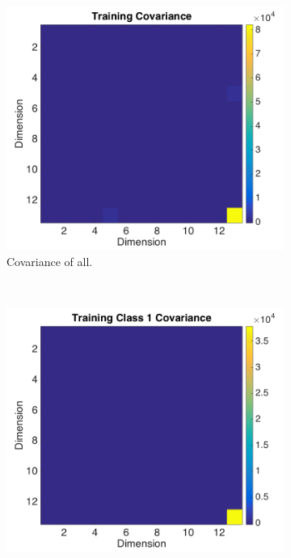 \documentclass[a4paper, 10pt, conference]{ieeeconf}
\begin{document}
\begin{figure}[!ht]
  \captionsetup[subfigure]{position=b}
  \centering
    \begin{subfigure}{0.45\textwidth}
      \includegraphics[width=\textwidth]{pic/covtraining.png}
      \caption{Covariance of all.}
      \label{fig:covtraining}
    \end{subfigure}
    ~
    \begin{subfigure}{0.45\textwidth}
      \includegraphics[width=\textwidth]{pic/covclass1.png}

\end{subfigure}
\end{figure}
\end{document}
